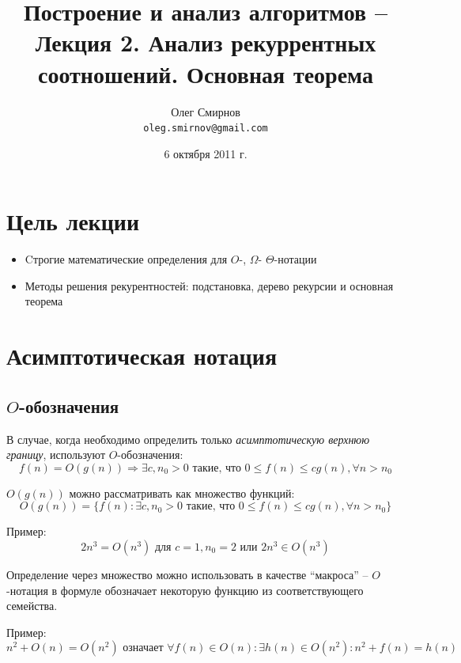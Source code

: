 \documentclass[a4paper,11pt]{article}
\author{Олег Смирнов\\
\texttt{oleg.smirnov@gmail.com}}
\date{6 октября 2011 г.}
\title{Построение и анализ алгоритмов -- Лекция 2. Анализ рекуррентных
соотношений. Основная теорема}
\begin{document}
\maketitle
\tableofcontents
\newpage

\section*{Цель лекции}
\begin{itemize}
\item Cтрогие математические определения для $O$-, $\Omega$-  $\Theta$-нотации
\item Методы решения рекурентностей: подстановка, дерево рекурсии и основная
теорема
\end{itemize}

\section{Асимптотическая нотация}

\subsection{$O$-обозначения}
В случае, когда необходимо определить только \emph{асимптотическую верхнюю 
границу}, используют $O$-обозначения:
\begin{equation*}
  f(n) = O(g(n)) \Rightarrow \exists c, n_0 > 0 \text{ такие, что }
  0 \leqslant f(n) \leqslant c g(n), \forall n > n_0
\end{equation*}

$O(g(n))$ можно рассматривать как множество функций:
\begin{equation*}
  O(g(n)) = \{f(n): \exists c, n_0 > 0 \text{ такие, что }
  0 \leqslant f(n) \leqslant c g(n), \forall n > n_0
  \}
\end{equation*}

Пример:
\begin{equation*}
  2n^3 = O(n^3) \text{ для } c = 1, n_0 = 2 \text{ или } 2n^3 \in O(n^3)
\end{equation*}

Определение через множество можно использовать в качестве ``макроса''
-- $O$-нотация в формуле обозначает некоторую функцию из соответствующего 
семейства.

Пример:
\begin{equation*}
  n^2 + O(n) = O(n^2) \text{ означает } \forall f(n) \in O(n):
  \exists h(n) \in O(n^2): n^2 + f(n) = h(n)
\end{equation*}
\end{document}
